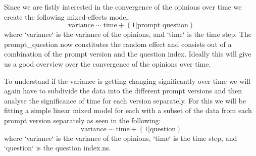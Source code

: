 \documentclass[12pt]{article}
\begin{document}
Since we are fistly interested in the convergence of the opinions over time we create the following mixed-effects model:
\begin{equation}
    \text{variance} \sim \text{time} + (1 | \text{prompt\_question})
\end{equation}
where `variance` is the variance of the opinions, and `time` is the time step. The prompt\_question now constitutes the random effect and consists out of a combination of the prompt version and the question index. Ideally this will give us a good overview over the convergence of the opinions over time. 

To understand if the variance is getting changing significantly over time we will again have to subdivide the data into the different prompt versions and then analyse the significance of time for each version separately. For this we will be fitting a simple linear mixed model for each with a subset of the data from each prompt version separately as seen in the following:
\begin{equation}
    \text{variance} \sim \text{time} + (1 | \text{question})
\end{equation}
where `variance` is the variance of the opinions, `time` is the time step, and `question` is the question index.ns.


\end{document}
